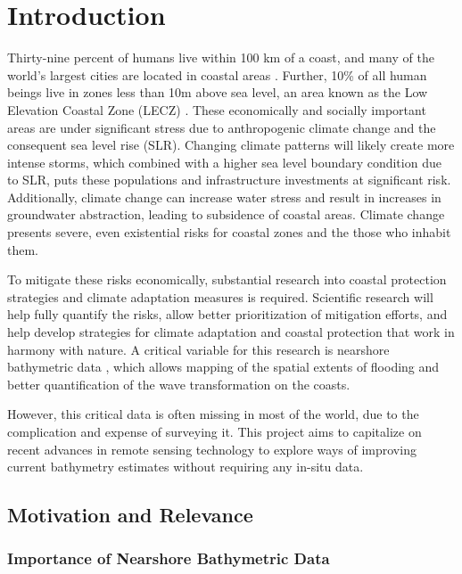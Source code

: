 \chapter{Introduction}

Thirty-nine percent of humans live within 100 km of a coast, and many of the world's largest cities are located in coastal areas \parencite{Magdalena2021}. Further, 10\% of all human beings live in zones less than 10m above sea level, an area known as the Low Elevation Coastal Zone (LECZ) \parencite{Neumann2015,Lichter2011}. These economically and socially important areas are under significant stress due to anthropogenic climate change and the consequent sea level rise (SLR). Changing climate patterns will likely create more intense storms, which combined with a higher sea level boundary condition due to SLR, puts these populations and infrastructure investments at significant risk. Additionally, climate change can increase water stress and result in increases in groundwater abstraction, leading to subsidence of coastal areas. Climate change presents severe, even existential risks for coastal zones and the those who inhabit them.

To mitigate these risks economically, substantial research into coastal protection strategies and climate adaptation measures is required. Scientific research will help fully quantify the risks, allow better prioritization of mitigation efforts, and help develop strategies for climate adaptation and coastal protection that work in harmony with nature. A critical variable for this research is nearshore bathymetric data \parencite{Holman2013}, which allows mapping of the spatial extents of flooding and better quantification of the wave transformation on the coasts. 

However, this critical data is often missing in most of the world, due to the complication and expense of surveying it. This project aims to capitalize on recent advances in remote sensing technology to explore ways of improving current bathymetry estimates without requiring any in-situ data. 

\section{Motivation and Relevance}
\subsection{Importance of Nearshore Bathymetric Data}

